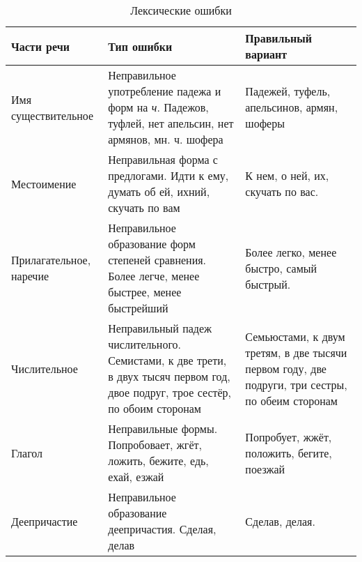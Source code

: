\documentclass{article}
\begin{document}
\begin{longtable}[c]{|p{3cm}|p{4cm}|p{4cm}|}
  \caption{Лексические ошибки}\\
  \hline
  \textbf{Части речи} & \textbf{Тип ошибки} & \textbf{Правильный вариант}\\
  \hline
  Имя существительное & Неправильное употребление падежа и форм на \textit{ч}. Падежов, туфлей, нет апельсин,
  нет армянов, мн. ч. шофера & Падежей, туфель, апельсинов, армян, шоферы\\
  \hline
  Местоимение & Неправильная форма с предлогами. Идти к ему, думать об ей, ихний, скучать по вам & К нем, о ней, их,
  скучать по вас.\\
  \hline
  Прилагательное, наречие & Неправильное образование форм степеней сравнения. Более легче, менее быстрее, менее
  быстрейший & Более легко, менее быстро, самый быстрый.\\
  \hline
  Числительное & Неправильный падеж числительного. Семистами, к две трети, в двух тысяч первом год, двое подруг,
  трое сестёр, по обоим сторонам & Семьюстами, к двум третям, в две тысячи первом году, две подруги, три сестры,
  по обеим сторонам\\
  \hline
  Глагол & Неправильные формы. Попробовает, жгёт, ложить, бежите, едь, ехай, езжай & Попробует, жжёт, положить, бегите,
  поезжай\\
  \hline
  Деепричастие & Неправильное образование деепричастия. Сделая, делав & Сделав, делая.\\
  \hline
\end{longtable}
\end{document}
